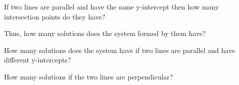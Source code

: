 \documentclass{ximera}
\author{Parisa Fatheddin}
\begin{document}
\begin{exercise}

If two lines are parallel and have the same y-intercept then how many intersection points do they have?
\begin{multipleChoice}
\end{multipleChoice}
Thus, how many solutions does the system formed by them have?
\begin{multipleChoice}
\end{multipleChoice}
How many solutions does the system have if two lines are parallel and have different y-intercepts?
\begin{multipleChoice}
\end{multipleChoice}
How many solutions if the two lines are perpendicular?
\begin{multipleChoice}
\end{multipleChoice} 



















\end{exercise}
\end{document}
